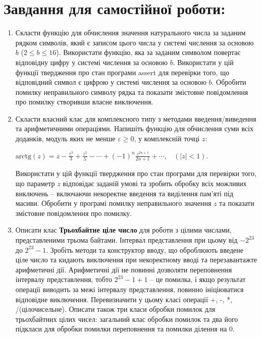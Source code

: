 \documentclass[a5paper,titlepage,openany,twoside,
]
{book_unv}%
\begin{document}
\section{Завдання для самостійної роботи:}
\begin{enumerate}
\def\labelenumi{\arabic{enumi})}
\setcounter{enumi}{2}
\item
Скласти функцію для обчислення значення натурального
числа за заданим рядком символів, який є записом цього числа у системі
числення за основою $b$ (\(2 \leq b \leq 16\)). Використати функцію, яка
за заданим символом повертає відповідну цифру у системі числення за
основою $b$. Використати у цій функції твердження про стан програми assert
для перевірки того, що відповідний символ є цифрою у системі числення за
основою $b$. Обробити помилку неправильного символу рядка та
показати змістовне повідомлення про помилку створивши власне виключення.

\item
Скласти власний клас для комплексного типу з методами введення/виведення 
та арифметичними операціями. Напишіть функцію для обчислення суми всіх доданків, модуль
яких не менше $\varepsilon \ge 0$, у комплексній точці $z$:

\(\text{arctg}\left( z \right) = z - \frac{z^{3}}{3} + \frac{z^{5}}{5} - \cdots + {(-1)}^{n}\frac{z^{2n+1}}{2n + 1} + \cdots,\ \ \ \ (\left| z \right| < 1)\).

Використати у цій функції твердження про стан програми для перевірки
того, що параметр $z$ відповідає заданій умові та зробить обробку
всіх можливих виключень -- включаючи некоректне введення та виділення
пам'яті під масиви. Обробити у програмі помилку неправильного значення
$z$ та показати змістовне повідомлення про помилку.

\item
Описати клас \textbf{Трьохбайтне ціле число} для роботи з цілими числами,
представленими трьома байтами. Інтервал представлення при цьому від
$-2^{23}$ до $2^{23}-1$. 
Зробіть методи та конструктор вводу, що оброблюють введене ціле число
та кидають виключення при некоректному вводі та перезавантажте арифметичні дії. 
Арифметичні дії не повинні дозволяти переповнення інтервалу представлення, 
тобто $2^{23}-1 + 1$ -- це помилка, і якщо результат операції виводить
 за межі інтервалу представлення, повинно
ініціюватися відповідне виключення. 
Перевизначити у цьому класі операції +, -, *, /(цілочисельне).
Описати також три класи обробки помилок для трьохбайтних цілих чисел:
загальний клас обробки помилок та два його підкласи для обробки помилки
переповнення та помилки ділення на 0.


\end{enumerate}
\end{document}
